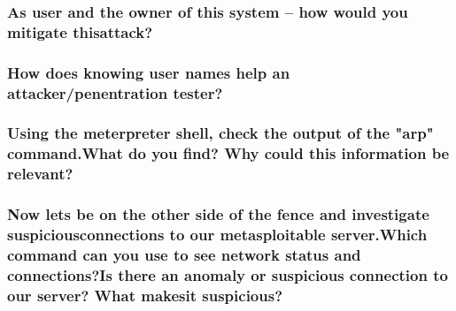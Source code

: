 \subsubsection{As user and the owner of this system -- how would you mitigate thisattack?}
\subsubsection{How does knowing user names help an attacker/penentration tester?}
\subsubsection{Using the meterpreter shell, check the output of the "arp" command.What do you find? Why could this information be relevant?}
\subsubsection{Now lets be on the other side of the fence and investigate suspiciousconnections to our metasploitable server.Which command can you use to see network status and connections?Is there an anomaly or suspicious connection to our server? What makesit suspicious?}